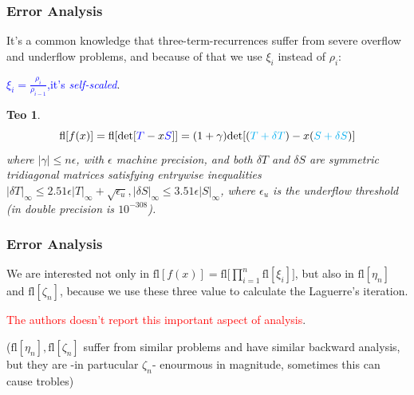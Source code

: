 \documentclass{beamer}
\theoremstyle{definition} \newtheorem{de}{Def}
\theoremstyle{remark} \newtheorem{os}[de]{Remark}
\theoremstyle{plain} \newtheorem{te}[de]{Teo}
\theoremstyle{plain} \newtheorem{co}[de]{Cor}
\theoremstyle{plain} \newtheorem{pr}[de]{Prop}
\theoremstyle{plain} \newtheorem{lem}[de]{Lemm}
\theoremstyle{remark} \newtheorem{rem}[de]{Remark}
\begin{document}
\begin{frame}
  \frametitle{Error Analysis}

It's a common knowledge that three-term-recurrences suffer from severe overflow and underflow problems, and because of that we use $\xi_i$ instead of $\rho_i$: 

\pause

\textcolor{blue}{$\xi_i=\frac{\rho_i}{\rho_{i-1}}$,it's \emph{self-scaled}}.

\pause

\begin{te}
  \begin{equation*}
    \text{fl}[f(x)] = \text{fl}[\text{det}[\textcolor{blue}{T}-x\textcolor{blue}{S}]] = (1 + \gamma)\text{det}[(\textcolor{cyan}{T+ \delta T}) -x(\textcolor{cyan}{S + \delta S})]
  \end{equation*}
  where $|\gamma|\le n\epsilon$, with $\epsilon$ machine precision, and both $\delta T$ and $\delta S$ are symmetric tridiagonal matrices satisfying entrywise inequalities $|\delta T|_{\infty}\le 2.51\epsilon |T|_{\infty} + \sqrt{\epsilon_u}, |\delta S|_{\infty}\le 3.51\epsilon |S|_{\infty}$, where $\epsilon_u$ is the underflow threshold (in double precision is $10^{-308}$).
\end{te}

\end{frame}

\begin{frame}
  \frametitle{Error Analysis}

We are interested not only in $\text{fl}[f(x)]=\text{fl}\Big[ \prod_{i=1}^n \text{fl}[\xi_i]  \Big]$, but also in $\text{fl}[\eta_n]$ and $\text{fl}[\zeta_n]$, because we use these three value to calculate the Laguerre's iteration.

\pause

\textcolor{red}{The authors doesn't report this important aspect of analysis}.

\pause

($\text{fl}[\eta_n],\text{fl}[\zeta_n]$ suffer from similar problems and have similar backward analysis, but they are -in partucular $\zeta_n$- enourmous in magnitude, sometimes this can cause trobles)

\end{frame}
\end{document}
